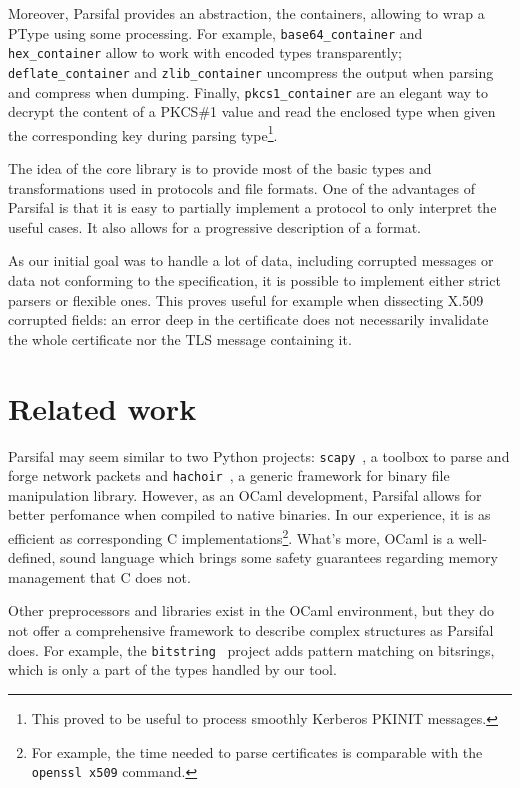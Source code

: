\documentclass{article}
\begin{document}
Moreover, Parsifal provides an abstraction, the containers, allowing
to wrap a PType using some processing. For example,
\texttt{base64\_container} and \texttt{hex\_container} allow to work
with encoded types transparently; \texttt{deflate\_container} and
\texttt{zlib\_container} uncompress the output when parsing and
compress when dumping. Finally, \texttt{pkcs1\_container} are an
elegant way to decrypt the content of a PKCS\#1 value and read the
enclosed type when given the corresponding key during parsing
type\footnote{This proved to be useful to process smoothly Kerberos
  PKINIT messages.}.

The idea of the core library is to provide most of the basic types and
transformations used in protocols and file formats. One of the
advantages of Parsifal is that it is easy to partially implement a
protocol to only interpret the useful cases. It also allows for a
progressive description of a format.

As our initial goal was to handle a lot of data, including corrupted
messages or data not conforming to the specification, it is possible to
implement either strict parsers or flexible ones. This proves useful
for example when dissecting X.509 corrupted fields: an error deep in
the certificate does not necessarily invalidate the whole certificate
nor the TLS message containing it.



\section{Related work}

Parsifal may seem similar to two Python projects:
\texttt{scapy}~\cite{scapy}, a toolbox to parse and forge network
packets and \texttt{hachoir}~\cite{hachoir}, a generic framework for
binary file manipulation library. However, as an OCaml development,
Parsifal allows for better perfomance when compiled to native
binaries. In our experience, it is as efficient as corresponding C
implementations\footnote{For example, the time needed to parse
  certificates is comparable with the \texttt{openssl x509}
  command.}. What's more, OCaml is a well-defined, sound language which
brings some safety guarantees regarding memory management that C does
not.

Other preprocessors and libraries exist in the OCaml environment, but
they do not offer a comprehensive framework to describe complex
structures as Parsifal does. For example, the
\texttt{bitstring}~\cite{bitstring} project adds pattern matching on
bitsrings, which is only a part of the types handled by our tool.
\end{document}
